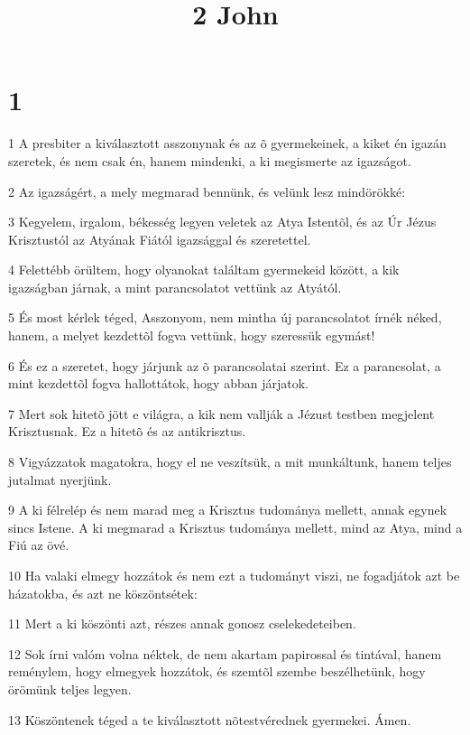 

\title{2 John}


\chapter{1}

\par 1 A presbiter a kiválasztott asszonynak és az õ gyermekeinek, a kiket én igazán szeretek, és nem csak én, hanem mindenki, a ki megismerte az igazságot.
\par 2 Az igazságért, a mely megmarad bennünk, és velünk lesz mindörökké:
\par 3 Kegyelem, irgalom, békesség legyen veletek az Atya Istentõl, és az Úr Jézus Krisztustól az Atyának Fiától igazsággal és szeretettel.
\par 4 Felettébb örültem, hogy olyanokat találtam gyermekeid között, a kik igazságban járnak, a mint parancsolatot vettünk az Atyától.
\par 5 És most kérlek téged, Asszonyom, nem mintha új parancsolatot írnék néked, hanem, a melyet kezdettõl fogva vettünk, hogy szeressük egymást!
\par 6 És ez a szeretet, hogy járjunk az õ parancsolatai szerint. Ez a parancsolat, a mint kezdettõl fogva hallottátok, hogy abban járjatok.
\par 7 Mert sok hitetõ jött e világra, a kik nem vallják a Jézust testben megjelent Krisztusnak. Ez a hitetõ és az antikrisztus.
\par 8 Vigyázzatok magatokra, hogy el ne veszítsük, a mit munkáltunk, hanem teljes jutalmat nyerjünk.
\par 9 A ki félrelép és nem marad meg a Krisztus tudománya mellett, annak egynek sincs Istene. A ki megmarad a Krisztus tudománya mellett, mind az Atya, mind a Fiú az övé.
\par 10 Ha valaki elmegy hozzátok és nem ezt a tudományt viszi, ne fogadjátok azt be házatokba, és azt ne köszöntsétek:
\par 11 Mert a ki köszönti azt, részes annak gonosz cselekedeteiben.
\par 12 Sok írni valóm volna néktek, de nem akartam papirossal és tintával, hanem reménylem, hogy elmegyek hozzátok, és szemtõl szembe beszélhetünk, hogy örömünk  teljes legyen.
\par 13 Köszöntenek téged a te kiválasztott nõtestvérednek gyermekei. Ámen.


